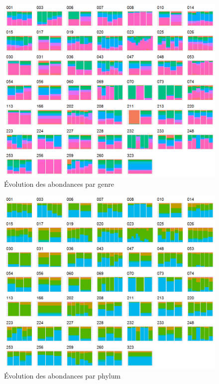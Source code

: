 \documentclass[12pt,a4paper]{article}
\begin{document}
{\begin{figure}
\begin{center}
\includegraphics[scale=0.70]{img/enfin_barplot_genus_norm.png}\hfill
\end{center}
\caption{Évolution des abondances par genre}
\label{plotabundancegenre}
\end{figure}

\begin{figure}
\begin{center}
\includegraphics[scale=0.70]{img/enfin_barplot_phylum_norm.png}\hfill
\end{center}
\caption{Évolution des abondances par phylum}
\label{plotabundancephylum}
\end{figure}


}
\end{document}

